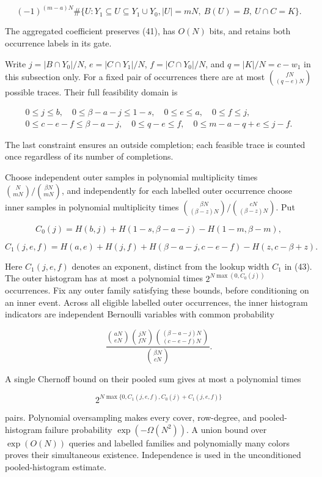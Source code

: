 \[
(-1)^{(m-a)N}\#\{U:Y_1\subseteq U\subseteq Y_1\cup Y_0,
 |U|=mN,\ B(U)=B,\ U\cap C=K\}.
\tag{47}
\]

The aggregated coefficient preserves (41), has \(O(N)\) bits, and retains both occurrence labels in its gate.

Write \(j=|B\cap Y_0|/N\), \(e=|C\cap Y_1|/N\), \(f=|C\cap Y_0|/N\), and \(q=|K|/N=c-w_1\) in this subsection only. For a fixed pair of occurrences there are at most \(\binom{fN}{(q-e)N}\) possible traces. Their full feasibility domain is

\[
\begin{gathered}
0\le j\le b,\quad0\le\beta-a-j\le1-s,\quad
0\le e\le a,\quad0\le f\le j,\\
0\le c-e-f\le\beta-a-j,\quad0\le q-e\le f,\quad
0\le m-a-q+e\le j-f.
\end{gathered}
\tag{48}
\]

The last constraint ensures an outside completion; each feasible trace is counted once regardless of its number of completions.

Choose independent outer samples in polynomial multiplicity times \(\binom N{mN}/\binom{\beta N}{mN}\), and independently for each labelled outer occurrence choose inner samples in polynomial multiplicity times \(\binom{\beta N}{(\beta-z)N}/\binom{cN}{(\beta-z)N}\). Put

\[
C_0(j)=H(b,j)+H(1-s,\beta-a-j)-H(1-m,\beta-m),
\]

\[
C_1(j,e,f)=H(a,e)+H(j,f)+H(\beta-a-j,c-e-f)-H(z,c-\beta+z).
\tag{49}
\]

Here \(C_1(j,e,f)\) denotes an exponent, distinct from the lookup width \(C_1\) in (43). The outer histogram has at most a polynomial times \(2^{N\max(0,C_0(j))}\) occurrences. Fix any outer family satisfying these bounds, before conditioning on an inner event. Across all eligible labelled outer occurrences, the inner histogram indicators are independent Bernoulli variables with common probability

\[
\frac{\binom{aN}{eN}\binom{jN}{fN}
\binom{(\beta-a-j)N}{(c-e-f)N}}{\binom{\beta N}{cN}}.
\]

A single Chernoff bound on their pooled sum gives at most a polynomial times

\[
2^{N\max\{0,C_1(j,e,f),C_0(j)+C_1(j,e,f)\}}
\tag{50}
\]

pairs. Polynomial oversampling makes every cover, row-degree, and pooled-histogram failure probability \(\exp(-\Omega(N^2))\). A union bound over \(\exp(O(N))\) queries and labelled families and polynomially many colors proves their simultaneous existence. Independence is used in the unconditioned pooled-histogram estimate.

